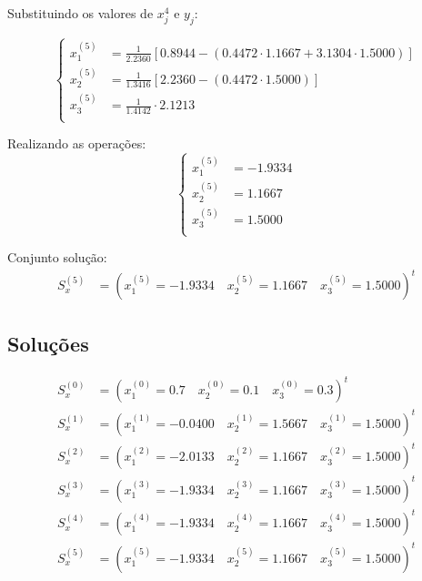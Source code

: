 \documentclass[12pt,a4paper]{article}
\begin{document}
Substituindo os valores de $x_j^{4}$ e $y_j$:

\[
\left\{
\begin{aligned}
x_1^{(5)} &= \frac{1}{2.2360} \left[ 0.8944 - \left(0.4472 \cdot 1.1667 + 3.1304 \cdot 1.5000\right) \right] \\
x_2^{(5)} &= \frac{1}{1.3416} \left[ 2.2360 - \left(0.4472 \cdot 1.5000\right) \right] \\
x_3^{(5)} &= \frac{1}{1.4142} \cdot 2.1213 \\
\end{aligned}
\right.
\]

Realizando as operações:
\[
\left\{
\begin{aligned}
x_1^{(5)} &= - 1.9334 \\
x_2^{(5)} &= 1.1667 \\
x_3^{(5)} &= 1.5000 \\
\end{aligned}
\right.
\]

Conjunto solução:
\begin{align*}
S_x^{(5)} &= ( x_1^{(5)} = - 1.9334 \quad x_2^{(5)} = 1.1667 \quad x_3^{(5)} = 1.5000 )^{t}
\end{align*}

\subsection{Soluções}
\begin{align*}
S_x^{(0)} &= ( x_1^{(0)} = 0.7 \quad x_2^{(0)} = 0.1 \quad x_3^{(0)} = 0.3 )^{t} \\
S_x^{(1)} &= ( x_1^{(1)} = -0.0400 \quad x_2^{(1)} = 1.5667 \quad x_3^{(1)} = 1.5000 )^{t} \\
S_x^{(2)} &= ( x_1^{(2)} = -2.0133 \quad x_2^{(2)} = 1.1667 \quad x_3^{(2)} = 1.5000 )^{t} \\
S_x^{(3)} &= ( x_1^{(3)} = - 1.9334 \quad x_2^{(3)} = 1.1667 \quad x_3^{(3)} = 1.5000 )^{t} \\
S_x^{(4)} &= ( x_1^{(4)} = - 1.9334 \quad x_2^{(4)} = 1.1667 \quad x_3^{(4)} = 1.5000 )^{t} \\
S_x^{(5)} &= ( x_1^{(5)} = - 1.9334 \quad x_2^{(5)} = 1.1667 \quad x_3^{(5)} = 1.5000 )^{t}
\end{align*}
\end{document}
